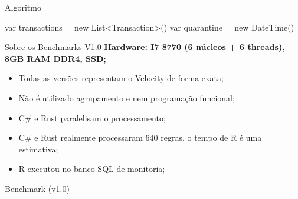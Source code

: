 \documentclass[aspectratio=169]{beamer}
\begin{document}
\begin{frame}{Algoritmo}
	\begin{algorithm}[H]
		var transactions = new List<Transaction>()\;
		var quarantine = new DateTime()\;
		\vspace{0.2cm}
	\end{algorithm}
\end{frame}

\begin{frame}{Sobre os Benchmarks V1.0}	
	\textbf{Hardware: I7 8770 (6 núcleos + 6 threads), 8GB RAM DDR4, SSD;}
	
	\begin{itemize}
		\item Todas as versões representam o Velocity de forma exata;
		\item Não é utilizado agrupamento e nem programação funcional;
		\item C\# e Rust paralelisam o processamento;
		\item C\# e Rust realmente processaram 640 regras, o tempo de R é uma estimativa;
		\item R executou no banco SQL de monitoria;
	\end{itemize}
\end{frame}

\begin{frame}{Benchmark (v1.0)}
	\begin{figure}
	\end{figure}
\end{frame}
\end{document}
